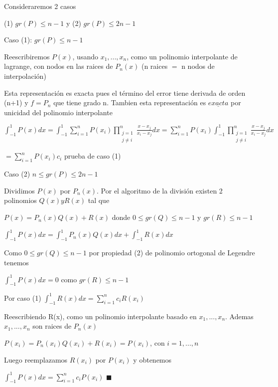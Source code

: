 \documentclass{article}
\begin{document}
Consideraremos 2 casos

(1) $gr(P)\leq n-1$ y (2) $gr(P) \leq 2n-1$

Caso (1): $gr(P)\leq n-1$

Reescribiremos $P(x)$, usando $x_1,...,x_n$, como un polinomio interpolante de
lagrange, con nodos en las raices de $P_n(x)$ (n raices $=$ n nodos de interpolación)

Esta representación es exacta pues el término del error tiene derivada de orden (n+1)
y $f=P_n$ que tiene grado n. Tambien esta representación es $\underline{exacta}$ por unicidad del polinomio interpolante

\vspace{5mm}

$\displaystyle\int_{-1}^1 P(x) dx = \displaystyle\int_{-1}^1 \sum\limits_{i=1}^n P(x_i) 
                 \prod\limits_{\substack{j = 1\\ j \not= i}}^n \frac{x-x_j}{x_i-x_j}dx  
                 = \sum\limits_{i=1}^n P(x_i) \displaystyle\int_{-1}^1 
                 \prod\limits_{\substack{j = 1\\ j \not= i}}^n \frac{x-x_j}{x_i-x_j}dx$

$= \sum\limits_{i = 1}^n P(x_i)c_i $ prueba de caso (1)

\vspace{5mm}

Caso (2) $n \leq gr(P) \leq 2n-1$

Dividimos $P(x)$ por $P_n(x)$. Por el algoritmo de la división existen 2 polinomios $Q(x) y R(x)$ tal que

$P(x) = P_n(x) Q(x) + R(x)$ donde $0 \leq gr(Q) \leq n-1$ y $gr(R) \leq n-1$

 \vspace{5mm}

 $\displaystyle\int_{-1}^1 P(x) dx = \displaystyle\int_{-1}^1 P_n(x)Q(x) dx + \displaystyle\int_{-1}^1 R(x) dx$

 Como $0 \leq gr(Q) \leq n-1$ por propiedad (2) de polinomio ortogonal de Legendre tenemos

$\displaystyle\int_{-1}^1 P(x) dx = 0$ como $gr(R) \leq n-1$

Por caso (1) $\displaystyle\int_{-1}^1 R(x) dx = \sum\limits_{i=1}^n c_i R(x_i)$

 \vspace{5mm}

 Reescribiendo R(x), como un polinomio interpolante basado en $x_1,...,x_n$. Ademas $x_1,...,x_n$ son raices de $P_n(x)$

 $P(x_i) = P_n(x_i)Q(x_i) + R(x_i) = P(x_i)$, con $i = 1,...,n$

 Luego reemplazamos $R(x_i)$ por $P(x_i)$ y obtenemos

 $\displaystyle\int_{-1}^1 P(x) dx = \sum\limits_{i=1}^n c_i P(x_i)$ $\blacksquare$



\vspace{10mm}
\end{document}
